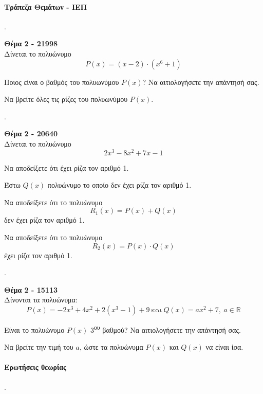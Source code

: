 \documentclass[11pt,a4paper,twocolumn]{article}
\newcounter{askhsh}
\newcommand{\askhsh}{{\large\theaskhsh.}\ \addtocounter{askhsh}{1}}
\newcommand{\tss}[1]{\textsuperscript{#1}}
\begin{document}
\paragraph{Τράπεζα Θεμάτων - ΙΕΠ}
\askhsh \textbf{Θέμα 2 - 21998}\\
Δίνεται το πολυώνυμο 
\[ P(x) = (x-2)\cdot (x^6+1) \]
\begin{alist}
\item Ποιος είναι ο βαθμός του πολυωνύμου $P(x)$? Να αιτιολογήσετε την απάντησή σας.
\item Να βρείτε όλες τις ρίζες του πολυωνύμου $P(x)$.
\end{alist}
\askhsh \textbf{Θέμα 2 - 20640}\\
Δίνεται το πολυώνυμο
\[ 2x^3-8x^2+7x-1 \]
\begin{alist}
\item Να αποδείξετε ότι έχει ρίζα τον αριθμό 1.
\item Έστω $Q(x)$ πολυώνυμο το οποίο δεν έχει ρίζα τον αριθμό 1.
\begin{rlist}
\item Να αποδείξετε ότι το πολυώνυμο
\[R_1(x)=P(x)+Q(x)\] 
δεν έχει ρίζα τον αριθμό 1.
\item Να αποδείξετε ότι το πολυώνυμο
\[ R_2(x)=P(x)\cdot Q(x) \]
έχει ρίζα τον αριθμό 1.
\end{rlist}
\end{alist}
\askhsh \textbf{Θέμα 2 - 15113}\\
Δίνονται τα πολυώνυμα:
\[ P(x)=-2x^3+4x^2+2(x^3-1)+9\ \text{και}\ Q(x)=ax^2+7,\ a\in\mathbb{R} \]
\begin{alist}
\item Είναι το πολυώνυμο $P(x)$ 3\tss{ου} βαθμού? Να αιτιολογήσετε την απάντησή σας.
\item Να βρείτε την τιμή του $a$, ώστε τα πολυώνυμα $P(x)$ και $Q(x)$ να είναι ίσα. 
\end{alist}
\paragraph{Ερωτήσεις θεωρίας}
\askhsh
\end{document}
